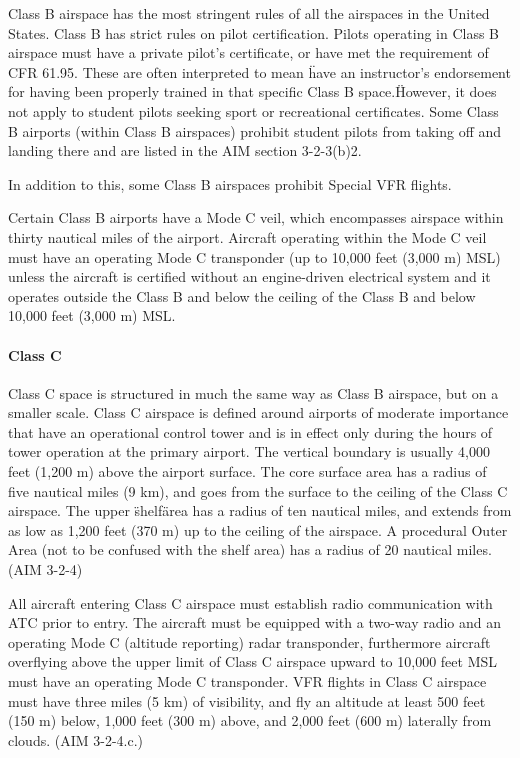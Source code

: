Class B airspace has the most stringent rules of all the airspaces in the United States. Class B has strict rules on pilot certification. Pilots operating in Class B airspace must have a private pilot's certificate, or have met the requirement of CFR 61.95. These are often interpreted to mean \"have an instructor's endorsement for having been properly trained in that specific Class B space.\" However, it does not apply to student pilots seeking sport or recreational certificates. Some Class B airports (within Class B airspaces) prohibit student pilots from taking off and landing there and are listed in the AIM section 3-2-3(b)2.

In addition to this, some Class B airspaces prohibit Special VFR flights.

Certain Class B airports have a Mode C veil, which encompasses airspace within thirty nautical miles of the airport. Aircraft operating within the Mode C veil must have an operating Mode C transponder (up to 10,000 feet (3,000 m) MSL) unless the aircraft is certified without an engine-driven electrical system and it operates outside the Class B and below the ceiling of the Class B and below 10,000 feet (3,000 m) MSL.

\paragraph{Class C}
Class C space is structured in much the same way as Class B airspace, but on a smaller scale. Class C airspace is defined around airports of moderate importance that have an operational control tower and is in effect only during the hours of tower operation at the primary airport. The vertical boundary is usually 4,000 feet (1,200 m) above the airport surface. The core surface area has a radius of five nautical miles (9 km), and goes from the surface to the ceiling of the Class C airspace. The upper \"shelf\" area has a radius of ten nautical miles, and extends from as low as 1,200 feet (370 m) up to the ceiling of the airspace. A procedural Outer Area (not to be confused with the shelf area) has a radius of 20 nautical miles.(AIM 3-2-4)

All aircraft entering Class C airspace must establish radio communication with ATC prior to entry. The aircraft must be equipped with a two-way radio and an operating Mode C (altitude reporting) radar transponder, furthermore aircraft overflying above the upper limit of Class C airspace upward to 10,000 feet MSL must have an operating Mode C transponder. VFR flights in Class C airspace must have three miles (5 km) of visibility, and fly an altitude at least 500 feet (150 m) below, 1,000 feet (300 m) above, and 2,000 feet (600 m) laterally from clouds. (AIM 3-2-4.c.)

